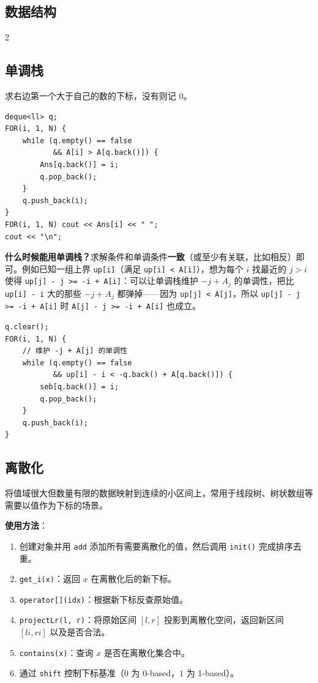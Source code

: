 	\begin{center}
		\section{数据结构}
	\end{center}

	\begin{multicols*}{2}

		\subsection{单调栈}

		求右边第一个大于自己的数的下标，没有则记 $0$。

		\begin{verbatim}
deque<ll> q;
FOR(i, 1, N) {
    while (q.empty() == false
           && A[i] > A[q.back()]) {
        Ans[q.back()] = i;
        q.pop_back();
    }
    q.push_back(i);
}
FOR(i, 1, N) cout << Ans[i] << " ";
cout << "\n";
		\end{verbatim}

		\textbf{什么时候能用单调栈？}求解条件和单调条件\textbf{一致}（或至少有关联，比如相反）即可。例如已知一组上界 \texttt{up[i]}（满足 \texttt{up[i] < A[i]}），想为每个 $i$ 找最近的 $j > i$ 使得 \texttt{up[j] - j >= -i + A[i]}：可以让单调栈维护 $-j + A_j$ 的单调性，把比 \texttt{up[i] - i} 大的那些 $-j + A_j$ 都弹掉——因为 \texttt{up[j] < A[j]}，所以 \texttt{up[j] - j >= -i + A[i]} 时 \texttt{A[j] - j >= -i + A[i]} 也成立。

		\begin{verbatim}
q.clear();
FOR(i, 1, N) {
    // 维护 -j + A[j] 的单调性
    while (q.empty() == false
           && up[i] - i < -q.back() + A[q.back()]) {
        seb[q.back()] = i;
        q.pop_back();
    }
    q.push_back(i);
}
		\end{verbatim}

		\subsection{离散化}

		将值域很大但数量有限的数据映射到连续的小区间上，常用于线段树、树状数组等需要以值作为下标的场景。

		\textbf{使用方法}：

		\begin{enumerate}
			\item 创建对象并用 \texttt{add} 添加所有需要离散化的值，然后调用 \texttt{init()} 完成排序去重。
			\item \texttt{get\_i(x)}：返回 $x$ 在离散化后的新下标。
			\item \texttt{operator[](idx)}：根据新下标反查原始值。
			\item \texttt{projectLr(l, r)}：将原始区间 $[l, r]$ 投影到离散化空间，返回新区间 $[li, ri]$ 以及是否合法。
			\item \texttt{contains(x)}：查询 $x$ 是否在离散化集合中。
			\item 通过 \texttt{shift} 控制下标基准（$0$ 为 0-based，$1$ 为 1-based）。
		\end{enumerate}


\end{multicols*}
